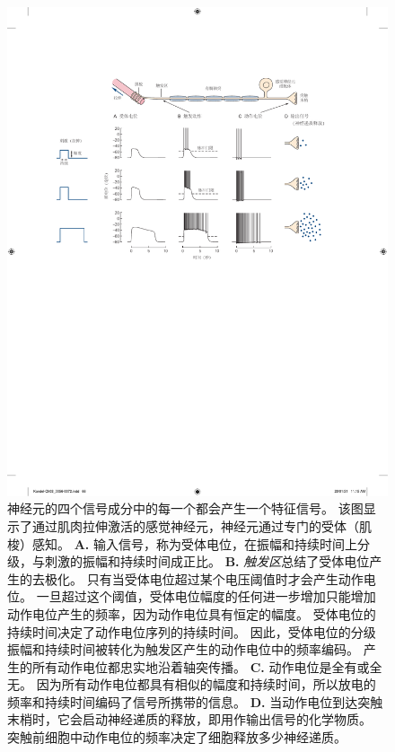 \begin{figure}[htbp]
	\centering
	\includegraphics[width=1.0\linewidth]{chap03/fig_3_9}
	\caption{神经元的四个信号成分中的每一个都会产生一个特征信号。
		该图显示了通过肌肉拉伸激活的感觉神经元，神经元通过专门的受体（肌梭）感知。 
		\textbf{A.} 输入信号，称为受体电位，在振幅和持续时间上分级，与刺激的振幅和持续时间成正比。 
		\textbf{B.} \textit{触发区}总结了受体电位产生的去极化。
		只有当受体电位超过某个电压阈值时才会产生动作电位。
		一旦超过这个阈值，受体电位幅度的任何进一步增加只能增加动作电位产生的频率，因为动作电位具有恒定的幅度。
		受体电位的持续时间决定了动作电位序列的持续时间。
		因此，受体电位的分级振幅和持续时间被转化为触发区产生的动作电位中的频率编码。
		产生的所有动作电位都忠实地沿着轴突传播。
		\textbf{C.} 动作电位是全有或全无。
		因为所有动作电位都具有相似的幅度和持续时间，所以放电的频率和持续时间编码了信号所携带的信息。
		\textbf{D.} 当动作电位到达突触末梢时，它会启动神经递质的释放，即用作输出信号的化学物质。
		突触前细胞中动作电位的频率决定了细胞释放多少神经递质。}
	\label{fig:3_9}
\end{figure}


